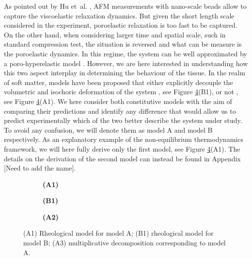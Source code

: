 \documentclass[runningheads]{llncs}
\begin{document}
As pointed out by Hu et~al. \cite{viscoporo}, AFM measurements with nano-scale beads allow to capture the viscoelastic relaxation dynamics. But given the short length scale considered in the experiment, poroelastic relaxation is too fast to be captured. On the other hand, when considering larger time and spatial scale, such in standard compression test, the situation is reversed and what can be measure is the poroelastic dynamics. In this regime, the system can be well approximated by a poro-hyperelastic model \cite{Reviewpolyel,ecm2}. However, we are here interested in understanding how this two aspect interplay in determining the behaviour of the tissue. In the realm of soft matter, models have been proposed that either explicitly decouple the volumetric and isochoric deformation of the system \cite{magneto,NGUYEN}, see Figure \ref{figmode}(B1), or not \cite{Article1,CACCAVO2}, see Figure \ref{figmode}(A1). We here consider both constitutive models with the aim of comparing their predictions and identify any difference that would allow us to predict experimentally which of the two better describe the system under study. To avoid any confusion, we will denote them as model A and model B respectively. As an explanatory example of the non-equilibrium thermodynamics framework, we will here fully derive only the first model, see Figure \ref{figmode}(A1). The details on the derivation of the second model can instead be found in Appendix [Need to add the name]. 

\begin{figure}[h!]
	\hspace{-10mm}
	\begin{subfigure}{0.32\textwidth}
		\centering
	\def\svgwidth{0.95\linewidth}
	
	\caption*{\textbf{(A1)}}
	\label{fig1A}
	\end{subfigure}
	\begin{subfigure}{0.32\textwidth}
	\centering
	\def\svgwidth{0.92\linewidth}
	
	\caption*{\textbf{(B1)}}
	\label{fig1B}
\end{subfigure}
\begin{subfigure}{0.34\textwidth}
	\Large
	\def\svgwidth{1.75\linewidth}
	
	\caption*{\textbf{(A2)}}
	\label{Model2}
\end{subfigure}
\vspace{5mm}
\caption{(A1) Rheological model for model A; (B1) rheological model for model B; (A3) multiplicative decomposition corresponding to model A.}
\label{figmode}
\end{figure}
\end{document}
